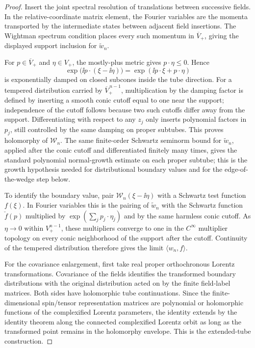 \begin{proof}
Insert the joint spectral resolution of translations between successive
fields.  In the relative-coordinate matrix element, the Fourier variables
are the momenta transported by the intermediate states between adjacent field
insertions.  The Wightman spectrum condition places every such momentum in
\(\overline V_+\), giving the displayed support inclusion for
\(\widetilde w_n\).

For \(p\in\overline V_+\) and \(\eta\in V_+\), the mostly-plus metric gives
\(p\cdot\eta\le0\).  Hence
\[
  \exp\bigl(\ii p\cdot(\xi-\ii\eta)\bigr)
  =
  \exp(\ii p\cdot\xi+p\cdot\eta)
\]
is exponentially damped on closed subcones inside the tube direction.  For a
tempered distribution carried by \(\overline V_+^{\,n-1}\), multiplication by
the damping factor is defined by inserting a smooth conic cutoff equal to one
near the support; independence of the cutoff follows because two such cutoffs
differ away from the support.  Differentiating with respect to any \(z_j\)
only inserts polynomial factors in \(p_j\), still controlled by the same
damping on proper subtubes.  This proves holomorphy of \(\mathcal W_n\).
The same finite-order Schwartz seminorm bound for \(\widetilde w_n\), applied
after the conic cutoff and differentiated finitely many times, gives the
standard polynomial normal-growth estimate on each proper subtube; this is
the growth hypothesis needed for distributional boundary values and for the
edge-of-the-wedge step below.

To identify the boundary value, pair \(\mathcal W_n(\xi-\ii\eta)\) with a
Schwartz test function \(f(\xi)\).  In Fourier variables this is the pairing
of \(\widetilde w_n\) with the Schwartz function \(\check f(p)\) multiplied
by \(\exp(\sum_jp_j\cdot\eta_j)\) and by the same harmless conic cutoff.
As \(\eta\to0\) within \(V_+^{n-1}\), these multipliers converge to one in
the \(C^\infty\) multiplier topology on every conic neighborhood of the
support after the cutoff.  Continuity of the tempered distribution therefore
gives the limit \(\langle w_n,f\rangle\).

For the covariance enlargement, first take real proper orthochronous Lorentz
transformations.  Covariance of the fields identifies the transformed
boundary distributions with the original distribution acted on by the finite
field-label matrices.  Both sides have holomorphic tube continuations.  Since
the finite-dimensional spin/tensor representation matrices are polynomial or
holomorphic functions of the complexified Lorentz parameters, the identity
extends by the identity theorem along the connected complexified Lorentz
orbit as long as the transformed point remains in the holomorphy envelope.
This is the extended-tube construction.


\end{proof}
